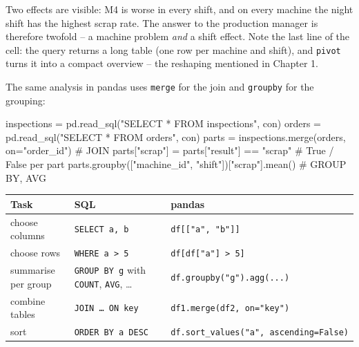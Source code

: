 \documentclass[
  letterpaper,
  DIV=11,
  numbers=noendperiod]{scrreprt}
\newenvironment{Shaded}{\begin{snugshade}}{\end{snugshade}}
\newcommand{\CommentTok}[1]{\textcolor[rgb]{0.37,0.37,0.37}{#1}}
\newcommand{\NormalTok}[1]{\textcolor[rgb]{0.00,0.23,0.31}{#1}}
\newcommand{\OperatorTok}[1]{\textcolor[rgb]{0.37,0.37,0.37}{#1}}
\newcommand{\StringTok}[1]{\textcolor[rgb]{0.13,0.47,0.30}{#1}}
\begin{document}
Two effects are visible: M4 is worse in every shift, and on every
machine the night shift has the highest scrap rate. The answer to the
production manager is therefore twofold -- a machine problem \emph{and}
a shift effect. Note the last line of the cell: the query returns a long
table (one row per machine and shift), and \texttt{pivot} turns it into
a compact overview -- the reshaping mentioned in Chapter 1.

The same analysis in pandas uses \texttt{merge} for the join and
\texttt{groupby} for the grouping:

\begin{Shaded}
\begin{Highlighting}[]
\NormalTok{inspections }\OperatorTok{=}\NormalTok{ pd.read\_sql(}\StringTok{"SELECT * FROM inspections"}\NormalTok{, con)}
\NormalTok{orders }\OperatorTok{=}\NormalTok{ pd.read\_sql(}\StringTok{"SELECT * FROM orders"}\NormalTok{, con)}
\NormalTok{parts }\OperatorTok{=}\NormalTok{ inspections.merge(orders, on}\OperatorTok{=}\StringTok{"order\_id"}\NormalTok{)              }\CommentTok{\# JOIN}
\NormalTok{parts[}\StringTok{"scrap"}\NormalTok{] }\OperatorTok{=}\NormalTok{ parts[}\StringTok{"result"}\NormalTok{] }\OperatorTok{==} \StringTok{"scrap"}                    \CommentTok{\# True / False per part}
\NormalTok{parts.groupby([}\StringTok{"machine\_id"}\NormalTok{, }\StringTok{"shift"}\NormalTok{])[}\StringTok{"scrap"}\NormalTok{].mean()         }\CommentTok{\# GROUP BY, AVG}
\end{Highlighting}
\end{Shaded}

\begin{longtable}[]{@{}
  >{\raggedright\arraybackslash}p{}
  >{\raggedright\arraybackslash}p{}
  >{\raggedright\arraybackslash}p{}@{}}
\toprule\noalign{}
\begin{minipage}[b]{\linewidth}\raggedright
Task
\end{minipage} & \begin{minipage}[b]{\linewidth}\raggedright
SQL
\end{minipage} & \begin{minipage}[b]{\linewidth}\raggedright
pandas
\end{minipage} \\
\midrule\noalign{}
\endhead
\bottomrule\noalign{}
\endlastfoot
choose columns & \texttt{SELECT\ a,\ b} &
\texttt{df{[}{[}"a",\ "b"{]}{]}} \\
choose rows & \texttt{WHERE\ a\ \textgreater{}\ 5} &
\texttt{df{[}df{[}"a"{]}\ \textgreater{}\ 5{]}} \\
summarise per group & \texttt{GROUP\ BY\ g} with \texttt{COUNT},
\texttt{AVG}, \ldots{} & \texttt{df.groupby("g").agg(...)} \\
combine tables & \texttt{JOIN\ …\ ON\ key} &
\texttt{df1.merge(df2,\ on="key")} \\
sort & \texttt{ORDER\ BY\ a\ DESC} &
\texttt{df.sort\_values("a",\ ascending=False)} \\
\end{longtable}
\end{document}
